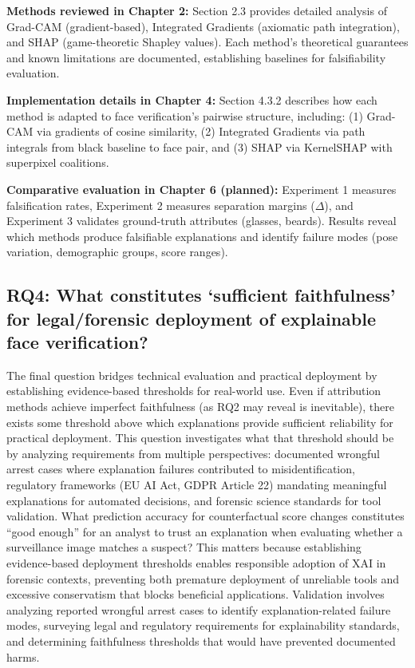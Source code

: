 \vspace{0.3cm}
\noindent\textbf{Methods reviewed in Chapter 2:} Section 2.3 provides detailed analysis of Grad-CAM (gradient-based), Integrated Gradients (axiomatic path integration), and SHAP (game-theoretic Shapley values). Each method's theoretical guarantees and known limitations are documented, establishing baselines for falsifiability evaluation.

\vspace{0.3cm}
\noindent\textbf{Implementation details in Chapter 4:} Section 4.3.2 describes how each method is adapted to face verification's pairwise structure, including: (1) Grad-CAM via gradients of cosine similarity, (2) Integrated Gradients via path integrals from black baseline to face pair, and (3) SHAP via KernelSHAP with superpixel coalitions.

\vspace{0.3cm}
\noindent\textbf{Comparative evaluation in Chapter 6 (planned):} Experiment 1 measures falsification rates, Experiment 2 measures separation margins ($\Delta$), and Experiment 3 validates ground-truth attributes (glasses, beards). Results reveal which methods produce falsifiable explanations and identify failure modes (pose variation, demographic groups, score ranges).

\subsection*{RQ4: What constitutes `sufficient faithfulness' for legal/forensic deployment of explainable face verification?}

The final question bridges technical evaluation and practical deployment by establishing evidence-based thresholds for real-world use. Even if attribution methods achieve imperfect faithfulness (as RQ2 may reveal is inevitable), there exists some threshold above which explanations provide sufficient reliability for practical deployment. This question investigates what that threshold should be by analyzing requirements from multiple perspectives: documented wrongful arrest cases where explanation failures contributed to misidentification, regulatory frameworks (EU AI Act, GDPR Article 22) mandating meaningful explanations for automated decisions, and forensic science standards for tool validation. What prediction accuracy for counterfactual score changes constitutes ``good enough'' for an analyst to trust an explanation when evaluating whether a surveillance image matches a suspect? This matters because establishing evidence-based deployment thresholds enables responsible adoption of XAI in forensic contexts, preventing both premature deployment of unreliable tools and excessive conservatism that blocks beneficial applications. Validation involves analyzing reported wrongful arrest cases to identify explanation-related failure modes, surveying legal and regulatory requirements for explainability standards, and determining faithfulness thresholds that would have prevented documented harms.

